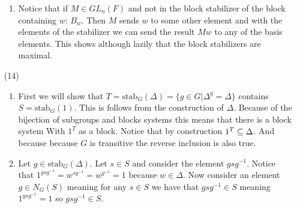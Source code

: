 \documentclass[12pt]{amsart}
\begin{document}
\begin{itemize}
\begin{enumerate}[label= (\alph*)]
      \item Notice that if $M\in GL_n(F)$ and not in the block stabilizer of the block containing $w$: $B_w$. 
      Then $M$ sends $w$ to some other element and with the elements of the stabilizer 
      we can send the result $Mw$ to any of the basis elements. This shows although lazily that the block stabilizers are maximal.

   \end{enumerate}
   
   \item[(14)]
   \begin{enumerate}[label= (\alph*)]
      \item First we will show that $T=\text{stab}_G(\Delta)=\{g\in G|\Delta^g=\Delta\}$ 
      contains $S=\text{stab}_G(1)$. This is follows from the construction of $\Delta$. 
      Because of the bijection of subgroups and blocks systems this means that there is a block system With $1^T$ as a block. 
      Notice that by construction $1^T\subseteq \Delta$. And because because $G$ is transitive the 
      reverse inclusion is also true.


      \item Let $g\in\text{stab}_G(\Delta)$. Let $s\in S$ and consider the element $gsg^{-1}$. Notice that 
      $1^{gsg^{-1}}=w^{sg^{-1}}=w^{g^{-1}}=1$ because $w\in \Delta$. Now consider an element $g\in N_G(S)$ meaning for 
      any $s\in S$ we have that $gsg^{-1}\in S$ meaning $1^{gsg^{-1}}=1$ so $gsg^{-1}\in S$.



\end{enumerate}
\end{itemize}
\end{document}
